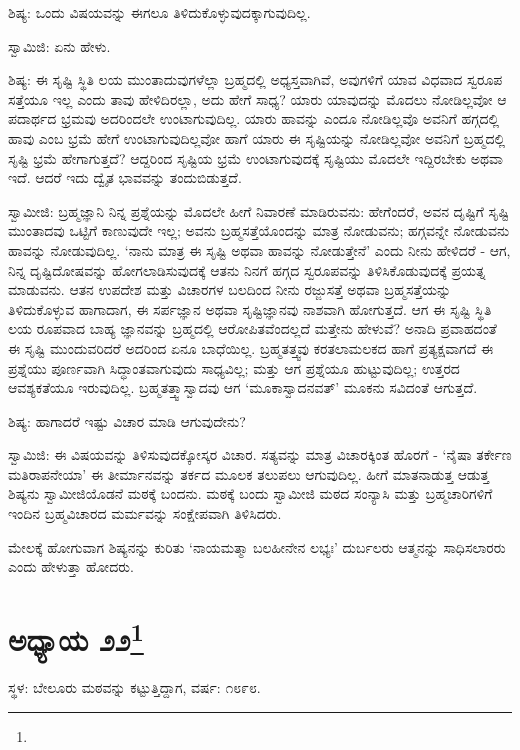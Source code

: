 ಶಿಷ್ಯ: ಒಂದು ವಿಷಯವನ್ನು ಈಗಲೂ ತಿಳಿದುಕೊಳ್ಳುವುದಕ್ಕಾಗುವುದಿಲ್ಲ.

ಸ್ವಾಮಿಜಿ: ಏನು ಹೇಳು.

ಶಿಷ್ಯ: ಈ ಸೃಷ್ಟಿ ಸ್ಥಿತಿ ಲಯ ಮುಂತಾದುವುಗಳೆಲ್ಲಾ ಬ್ರಹ್ಮದಲ್ಲಿ ಅಧ್ಯಸ್ತವಾಗಿವೆ, ಅವುಗಳಿಗೆ ಯಾವ ವಿಧವಾದ ಸ್ವರೂಪ ಸತ್ತೆಯೂ ಇಲ್ಲ ಎಂದು ತಾವು ಹೇಳಿದಿರಲ್ಲಾ, ಅದು ಹೇಗೆ ಸಾಧ್ಯ? ಯಾರು ಯಾವುದನ್ನು ಮೊದಲು ನೋಡಿಲ್ಲವೋ ಆ ಪದಾರ್ಥದ ಭ್ರಮವು ಅದರಿಂದಲೇ ಉಂಟಾಗುವುದಿಲ್ಲ. ಯಾರು ಹಾವನ್ನು ಎಂದೂ ನೋಡಿಲ್ಲವೊ ಅವನಿಗೆ ಹಗ್ಗದಲ್ಲಿ ಹಾವು ಎಂಬ ಭ್ರಮೆ ಹೇಗೆ ಉಂಟಾಗುವುದಿಲ್ಲವೋ ಹಾಗೆ ಯಾರು ಈ ಸೃಷ್ಟಿಯನ್ನು ನೋಡಿಲ್ಲವೋ ಅವನಿಗೆ ಬ್ರಹ್ಮದಲ್ಲಿ ಸೃಷ್ಟಿ ಭ್ರಮೆ ಹೇಗಾಗುತ್ತದೆ? ಆದ್ದರಿಂದ ಸೃಷ್ಟಿಯ ಭ್ರಮೆ ಉಂಟಾಗುವುದಕ್ಕೆ ಸೃಷ್ಟಿಯು ಮೊದಲೇ ಇದ್ದಿರಬೇಕು ಅಥವಾ ಇದೆ. ಆದರೆ ಇದು ದ್ವೈತ ಭಾವವನ್ನು ತಂದುಬಿಡುತ್ತದೆ.

ಸ್ವಾಮೀಜಿ: ಬ್ರಹ್ಮಜ್ಞಾನಿ ನಿನ್ನ ಪ್ರಶ್ನೆಯನ್ನು ಮೊದಲೇ ಹೀಗೆ ನಿವಾರಣೆ ಮಾಡಿರುವನು: ಹೇಗೆಂದರೆ, ಅವನ ದೃಷ್ಟಿಗೆ ಸೃಷ್ಟಿ ಮುಂತಾದವು ಒಟ್ಟಿಗೆ ಕಾಣುವುದೇ ಇಲ್ಲ; ಅವನು ಬ್ರಹ್ಮಸತ್ತೆಯೊಂದನ್ನು ಮಾತ್ರ ನೋಡುವನು; ಹಗ್ಗವನ್ನೇ ನೋಡುವನು ಹಾವನ್ನು ನೋಡುವುದಿಲ್ಲ. ‘ನಾನು ಮಾತ್ರ ಈ ಸೃಷ್ಟಿ ಅಥವಾ ಹಾವನ್ನು ನೋಡುತ್ತೇನೆ’ ಎಂದು ನೀನು ಹೇಳಿದರೆ - ಆಗ, ನಿನ್ನ ದೃಷ್ಟಿದೋಷವನ್ನು ಹೋಗಲಾಡಿಸುವುದಕ್ಕೆ ಆತನು ನಿನಗೆ ಹಗ್ಗದ ಸ್ವರೂಪವನ್ನು ತಿಳಿಸಿಕೊಡುವುದಕ್ಕೆ ಪ್ರಯತ್ನ ಮಾಡುವನು. ಆತನ ಉಪದೇಶ ಮತ್ತು ವಿಚಾರಗಳ ಬಲದಿಂದ ನೀನು ರಜ್ಜುಸತ್ತೆ ಅಥವಾ ಬ್ರಹ್ಮಸತ್ತೆಯನ್ನು ತಿಳಿದುಕೊಳ್ಳುವ ಹಾಗಾದಾಗ, ಈ ಸರ್ಪಜ್ಞಾನ ಅಥವಾ ಸೃಷ್ಟಿಜ್ಞಾನವು ನಾಶವಾಗಿ ಹೋಗುತ್ತದೆ. ಆಗ ಈ ಸೃಷ್ಟಿ ಸ್ಥಿತಿ ಲಯ ರೂಪವಾದ ಬಾಹ್ಯ ಜ್ಞಾನವನ್ನು ಬ್ರಹ್ಮದಲ್ಲಿ ಆರೋಪಿತವೆಂದಲ್ಲದೆ ಮತ್ತೇನು ಹೇಳುವೆ? ಅನಾದಿ ಪ್ರವಾಹದಂತೆ ಈ ಸೃಷ್ಟಿ ಮುಂದುವರಿದರೆ ಅದರಿಂದ ಏನೂ ಬಾಧೆಯಿಲ್ಲ. ಬ್ರಹ್ಮತತ್ತ್ವವು ಕರತಲಾಮಲಕದ ಹಾಗೆ ಪ್ರತ್ಯಕ್ಷವಾಗದೆ ಈ ಪ್ರಶ್ನೆಯು ಪೂರ್ಣವಾಗಿ ಸಿದ್ಧಾಂತವಾಗುವುದು ಸಾಧ್ಯವಿಲ್ಲ; ಮತ್ತು ಆಗ ಪ್ರಶ್ನೆಯೂ ಹುಟ್ಟುವುದಿಲ್ಲ; ಉತ್ತರದ ಆವಶ್ಯಕತೆಯೂ ಇರುವುದಿಲ್ಲ. ಬ್ರಹ್ಮತತ್ತ್ವಾಸ್ವಾದವು ಆಗ ‘ಮೂಕಾಸ್ವಾದನವತ್’ ಮೂಕನು ಸವಿದಂತೆ ಆಗುತ್ತದೆ.

ಶಿಷ್ಯ: ಹಾಗಾದರೆ ಇಷ್ಟು ವಿಚಾರ ಮಾಡಿ ಆಗುವುದೇನು?

ಸ್ವಾಮಿಜಿ: ಈ ವಿಷಯವನ್ನು ತಿಳಿಸುವುದಕ್ಕೋಸ್ಕರ ವಿಚಾರ. ಸತ್ಯವನ್ನು ಮಾತ್ರ ವಿಚಾರಕ್ಕಿಂತ ಹೊರಗೆ - ‘ನೈಷಾ ತರ್ಕೇಣ ಮತಿರಾಪನೇಯಾ’ ಈ ತೀರ್ಮಾನವನ್ನು ತರ್ಕದ ಮೂಲಕ ತಲುಪಲು ಆಗುವುದಿಲ್ಲ. ಹೀಗೆ ಮಾತನಾಡುತ್ತ ಆಡುತ್ತ ಶಿಷ್ಯನು ಸ್ವಾಮೀಜಿಯೊಡನೆ ಮಠಕ್ಕೆ ಬಂದನು. ಮಠಕ್ಕೆ ಬಂದು ಸ್ವಾಮೀಜಿ ಮಠದ ಸಂನ್ಯಾಸಿ ಮತ್ತು ಬ್ರಹ್ಮಚಾರಿಗಳಿಗೆ ಇಂದಿನ ಬ್ರಹ್ಮವಿಚಾರದ ಮರ್ಮವನ್ನು ಸಂಕ್ಷೇಪವಾಗಿ ತಿಳಿಸಿದರು.

ಮೇಲಕ್ಕೆ ಹೋಗುವಾಗ ಶಿಷ್ಯನನ್ನು ಕುರಿತು ‘ನಾಯಮತ್ಮಾ ಬಲಹೀನೇನ ಲಭ್ಯಃ’ ದುರ್ಬಲರು ಆತ್ಮನನ್ನು ಸಾಧಿಸಲಾರರು ಎಂದು ಹೇಳುತ್ತಾ ಹೋದರು.

\newpage

\chapter[ಅಧ್ಯಾಯ ೨೨]{ಅಧ್ಯಾಯ ೨೨\protect\footnote{}}

\centerline{ಸ್ಥಳ: ಬೇಲೂರು ಮಠವನ್ನು ಕಟ್ಟುತ್ತಿದ್ದಾಗ, ವರ್ಷ: ೧೮೯೮.}

